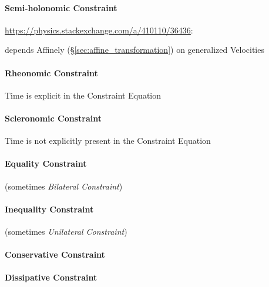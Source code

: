 \paragraph{Semi-holonomic Constraint}\label{sec:semiholonomic_constraint}\hfill

\url{https://physics.stackexchange.com/a/410110/36436}:

depends Affinely (\S\ref{sec:affine_transformation}) on generalized Velocities



\paragraph{Rheonomic Constraint}\label{sec:rheonomic_constraint}\hfill

Time is explicit in the Constraint Equation



\paragraph{Scleronomic Constraint}\label{sec:scleronomic_constraint}\hfill

Time is not explicitly present in the Constraint Equation



\paragraph{Equality Constraint}\label{sec:equality_constraint}\hfill

(sometimes \emph{Bilateral Constraint})



\paragraph{Inequality Constraint}\label{sec:inequality_constraint}\hfill

(sometimes \emph{Unilateral Constraint})



\paragraph{Conservative Constraint}\label{sec:conservative_constraint}\hfill

\paragraph{Dissipative Constraint}\label{sec:dissipative_constraint}\hfill



